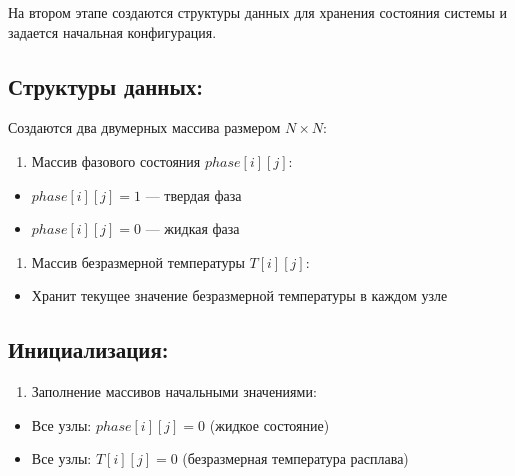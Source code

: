 \documentclass[
  12pt,
  a4paper,
  DIV=11,
  numbers=noendperiod]{scrreprt}
\providecommand{\tightlist}{%
  \setlength{\itemsep}{0pt}\setlength{\parskip}{0pt}}\usepackage{longtable,booktabs,array}
\begin{document}
На втором этапе создаются структуры данных для хранения состояния
системы и задается начальная конфигурация.

\subsection{Структуры
данных:}\label{ux441ux442ux440ux443ux43aux442ux443ux440ux44b-ux434ux430ux43dux43dux44bux445}

Создаются два двумерных массива размером \(N \times N\):

\begin{enumerate}
\def\labelenumi{\arabic{enumi}.}
\tightlist
\item
  Массив фазового состояния \(phase[i][j]\):
\end{enumerate}

\begin{itemize}
\tightlist
\item
  \(phase[i][j] = 1\) --- твердая фаза
\item
  \(phase[i][j] = 0\) --- жидкая фаза
\end{itemize}

\begin{enumerate}
\def\labelenumi{\arabic{enumi}.}
\setcounter{enumi}{1}
\tightlist
\item
  Массив безразмерной температуры \(T[i][j]\):
\end{enumerate}

\begin{itemize}
\tightlist
\item
  Хранит текущее значение безразмерной температуры в каждом узле
\end{itemize}

\subsection{Инициализация:}\label{ux438ux43dux438ux446ux438ux430ux43bux438ux437ux430ux446ux438ux44f}

\begin{enumerate}
\def\labelenumi{\arabic{enumi}.}
\tightlist
\item
  Заполнение массивов начальными значениями:
\end{enumerate}

\begin{itemize}
\tightlist
\item
  Все узлы: \(phase[i][j] = 0\) (жидкое состояние)
\item
  Все узлы: \(T[i][j] = 0\) (безразмерная температура расплава)
\end{itemize}
\end{document}
